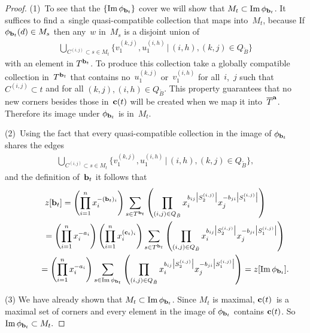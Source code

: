 \documentclass[pdftex]{sigma}
\numberwithin{equation}{section}
\DeclareMathOperator{\Ima}{Im}
\begin{document}
\begin{proof}
(1)~To see that the $\{\Ima \phi_{{\bf b}_t}\}$ cover we will show that $M_t \subset \Ima\phi_{{\bf b}_t}$.  It suf\/f\/ices to f\/ind a~single quasi-compatible collection that maps into~$M_t$, because
If $\phi_{{\bf b}_t}(d) \in M_s$ then any~$w$ in~$M_s$ is a disjoint union of
\begin{gather*}
\bigcup_{C^{(i,j)}\subset s \in M_t}\big\{ v_1^{(k,j)},u_1^{(i,h)} \, |\, (i,h),(k,j) \in Q_{\tilde B} \big\}
\end{gather*}
 with an element in $T^{{\bf b}_t}$.
To produce this collection take a globally compatible collection in~$T^{{\bf b}_t}$ that contains no~$u_1^{(k,j)}$ or~$v_1^{(i,h)}$ for all~$i$,~$j$ such that $C^{(i,j)} \subset t$ and for all $(k,j),(i,h) \in Q_{\tilde B}$.  This property guarantees that no new corners  besides those in~${\bf c}(t)$ will be created when we map it into~$\overline{T}^{\bf a}$. Therefore its image under $\phi_{{\bf b}_t}$ is in~$M_t$.


(2)~Using the fact that every quasi-compatible collection in the image of $\phi_{{\bf b}_t}$ shares the edges
\begin{gather*}
\bigcup_{C^{(i,j)}\subset s \in M_t}\big\{ v_1^{(k,j)},u_1^{(i,h)} \,|\,(i,h),(k,j) \in Q_{\tilde B} \big\},
\end{gather*}
 and the def\/inition of~${\bf b}_t$ it follows that
\begin{gather*}
z[{\bf b}_t]  = \left(\prod_{i=1}^n  x_i^{-({\bf b}_t)_i}\right)
\sum_{s \in T^{{\bf b}_t}}\left(\prod_{(i,j)\in Q_{\tilde B} }  x_{i}^{b_{ij}\big|S^{(i,j)}_2\big|} x_{j}^{-b_{ji}\big|S^{(i,j)}_1\big|}\right) \\
\hphantom{z[{\bf b}_t]}{}
 =  \left(\prod_{i=1}^n  x_i^{-a_i}\right)\left(\prod_{i=1}^n  x_i^{({\bf c}_t)_i}\right)
\sum_{s \in T^{{\bf b}_t}}\left(\prod_{(i,j)\in Q_{\tilde B} }  x_{i}^{b_{ij}\big|S^{(i,j)}_2\big|} x_{j}^{-b_{ji}\big|S^{(i,j)}_1\big|}\right) \\
\hphantom{z[{\bf b}_t]}{}
= \left(\prod_{i=1}^n  x_i^{-a_i}\right)
\sum_{s \in \Ima \phi_{{\bf b}_t}}\left(\prod_{(i,j)\in Q_{\tilde B} }  x_{i}^{b_{ij}\big|S^{(i,j)}_2\big|} x_{j}^{-b_{ji}\big|S^{(i,j)}_1\big|}\right)
 = z[\Ima \phi_{{\bf b}_t}].
\end{gather*}

(3) We have already shown that $M_t \subset \Ima \phi_{{\bf b}_t}$. Since $M_t$ is maximal, ${\bf c}(t)$~is a maximal set of corners and every element in the image of $\phi_{{\bf b}_t}$ contains ${\bf c}(t)$. So $ \Ima \phi_{{\bf b}_t}\subset M_t.$
\end{proof}
\end{document}
